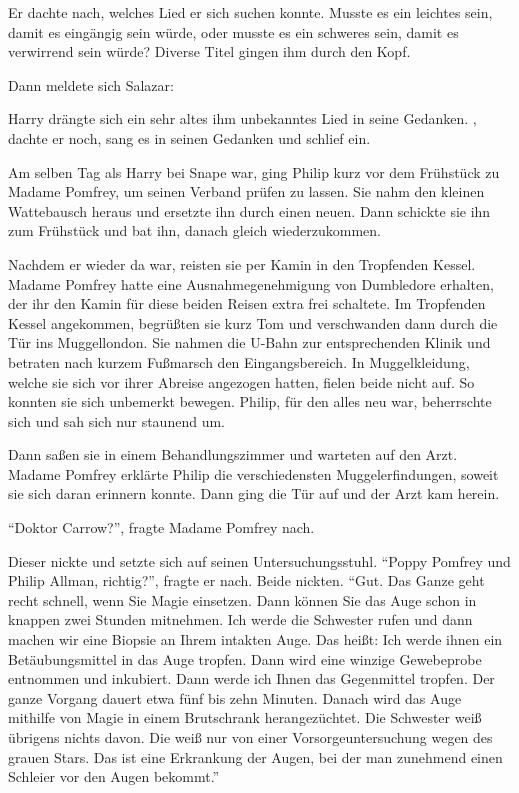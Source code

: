Er dachte nach, welches Lied er sich suchen konnte. Musste es ein leichtes sein, damit es eingängig sein würde, oder musste es ein schweres sein, damit es verwirrend sein würde? Diverse Titel gingen ihm durch den Kopf.

Dann meldete sich Salazar: 

Harry drängte sich ein sehr altes ihm unbekanntes Lied in seine Gedanken. , dachte er noch, sang es in seinen Gedanken und schlief ein.

Am selben Tag als Harry bei Snape war, ging Philip kurz vor dem Frühstück zu Madame Pomfrey, um seinen Verband prüfen zu lassen. Sie nahm den kleinen Wattebausch heraus und ersetzte ihn durch einen neuen. Dann schickte sie ihn zum Frühstück und bat ihn, danach gleich wiederzukommen.

Nachdem er wieder da war, reisten sie per Kamin in den Tropfenden Kessel. Madame Pomfrey hatte eine Ausnahmegenehmigung von Dumbledore erhalten, der ihr den Kamin für diese beiden Reisen extra frei schaltete. Im Tropfenden Kessel angekommen, begrüßten sie kurz Tom und verschwanden dann durch die Tür ins Muggellondon. Sie nahmen die U-Bahn zur entsprechenden Klinik und betraten nach kurzem Fußmarsch den Eingangsbereich. In Muggelkleidung, welche sie sich vor ihrer Abreise angezogen hatten, fielen beide nicht auf. So konnten sie sich unbemerkt bewegen. Philip, für den alles neu war, beherrschte sich und sah sich nur staunend um.

Dann saßen sie in einem Behandlungszimmer und warteten auf den Arzt. Madame Pomfrey erklärte Philip die verschiedensten Muggelerfindungen, soweit sie sich daran erinnern konnte. Dann ging die Tür auf und der Arzt kam herein.

\enquote{Doktor Carrow?}, fragte Madame Pomfrey nach.

Dieser nickte und setzte sich auf seinen Untersuchungsstuhl. \enquote{Poppy Pomfrey und Philip Allman, richtig?}, fragte er nach. Beide nickten. \enquote{Gut. Das Ganze geht recht schnell, wenn Sie Magie einsetzen. Dann können Sie das Auge schon in knappen zwei Stunden mitnehmen. Ich werde die Schwester rufen und dann machen wir eine Biopsie an Ihrem intakten Auge. Das heißt: Ich werde ihnen ein Betäubungsmittel in das Auge tropfen. Dann wird eine winzige Gewebeprobe entnommen und inkubiert. Dann werde ich Ihnen das Gegenmittel tropfen. Der ganze Vorgang dauert etwa fünf bis zehn Minuten. Danach wird das Auge mithilfe von Magie in einem Brutschrank herangezüchtet. \gst Die Schwester weiß übrigens nichts davon. Die weiß nur von einer Vorsorgeuntersuchung wegen des grauen Stars. Das ist eine Erkrankung der Augen, bei der man zunehmend einen Schleier vor den Augen bekommt.}

